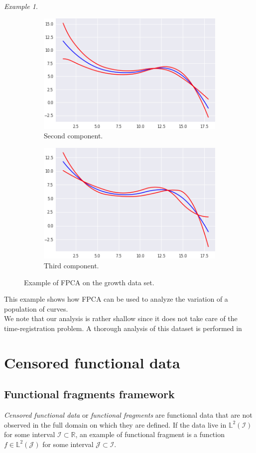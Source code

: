 \documentclass[10pt, a4paper]{report}
\newcommand{\Ll}[0]{\mathbb{L}}
\newcommand{\R}[0]{\mathbb{R}}
\theoremstyle{definition}
\theoremstyle{remark}
\newtheorem{ex}{Example}
\begin{document}
\begin{ex}
\begin{figure}[H]
		
		\begin{subfigure}{.4\textwidth}
			\centering
			\includegraphics[width=.8\linewidth]{Code/images/14/pca2}
			\caption{\centering Second component.}
		\end{subfigure}%
			\begin{subfigure}{.4\textwidth}
				\centering
				\includegraphics[width=.8\linewidth]{Code/images/14/pca3}
				\caption{\centering Third component.}
			\end{subfigure}
		\caption{Example of FPCA on the growth data set.}
		\label{fig:exfpca}
	\end{figure}
	This example shows how FPCA can be used to analyze the variation of a population of curves.\\
	We note that our analysis is rather shallow since it does not take care of the time-registration problem. A thorough analysis of this dataset is performed in \cite[Chapter 6]{apfda}
\end{ex}
\chapter{Censored functional data}\label{chap:frags}
\section{Functional fragments framework}\label{introfrag}
\textit{Censored functional data} or \textit{functional fragments} are functional data that are not observed in the full domain on which they are defined. If the data live in $\Ll^2(\mathcal{I})$ for some interval $\mathcal{I} \subset \R$, an example of functional fragment is a function $f \in \Ll^2(\mathcal{J})$ for some interval $\mathcal{J}\subset \mathcal{I}$.
\end{document}
